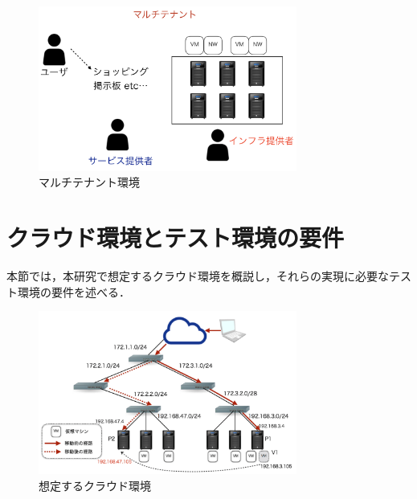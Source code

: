\documentclass[submit,techrep]{ipsj}
\begin{document}
\begin{figure}[tb]
	\includegraphics[width=8.5cm,bb=0 0 941 514]{fig/user.png}
	\caption{マルチテナント環境}
	\label{fig:user}
\end{figure}

\section{クラウド環境とテスト環境の要件}
本節では，本研究で想定するクラウド環境を概説し，それらの実現に必要なテスト環境の要件を述べる．
\begin{figure}[tb]
	\includegraphics[width=8.5cm,bb=0 0 579 366]{fig/cloud.png}
	\caption{想定するクラウド環境}
	\label{fig:cloud}
\end{figure}
\end{document}
